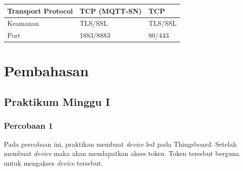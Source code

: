 \documentclass{class}
\begin{document}
\begin{table}[]
\begin{tabular}{|l|l|l|}
  Transport Protocol                                     & TCP (MQTT-SN)                                                                                          & TCP                                                                                                    \\ \hline
  Keamanan                                               & TLS/SSL                                                                                                & TLS/SSL                                                                                                \\ \hline
  Port                                                   & 1883/8883                                                                                              & 80/443                                                                                                 \\ \hline
  \end{tabular}
  \end{table} 

    \chapter{Pembahasan}
  \section{Praktikum Minggu I}
    \subsection{Percobaan 1}
    Pada percobaan ini, praktikan membuat \emph{device} led pada Thingsboard.
    Setelah membuat \emph{device} maka akan mendapatkan akses token.
    Token tersebut berguna untuk mengakses \emph{device} tersebut.
\end{document}
